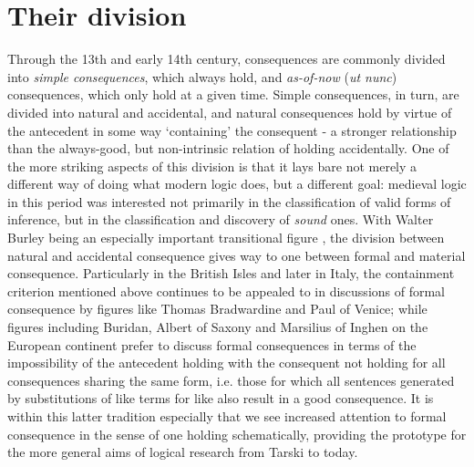\documentclass[]{article}
\begin{document}
\section{Their division}
Through the 13th and early 14th century, 
consequences are commonly divided into \emph{simple consequences}, 
which always hold, 
and \emph{as-of-now} (\emph{ut nunc}) consequences, 
which only hold at a given time. 
Simple consequences, 
in turn, 
are divided into natural and accidental, 
and natural consequences hold by virtue of the antecedent in some way `containing' the consequent 
- a stronger relationship than the always-good, 
but non-intrinsic relation of holding accidentally. 
One of the more striking aspects of this division is that it lays bare not merely a different way of doing what modern logic does, 
but a different goal: 
medieval logic in this period was interested not primarily in the classification of valid forms of inference, 
but in the classification and discovery of \emph{sound} ones. 
With Walter Burley being an especially important transitional figure \autocite{Archambault2018b}, 
the division between natural and accidental consequence gives way to one between formal and material consequence. 
Particularly in the British Isles and later in Italy, 
the containment criterion mentioned above continues to be appealed to in discussions of formal consequence by figures like Thomas Bradwardine and Paul of Venice; 
while figures including Buridan, 
Albert of Saxony 
and Marsilius of Inghen on the European continent prefer to discuss formal consequences in terms of 
the impossibility of the antecedent holding with the consequent not holding 
for all consequences sharing the same form, 
i.e. those for which all sentences generated by substitutions of like terms for like also result in a good consequence.
It is within this latter tradition especially that we see increased attention to formal consequence 
in the sense of one holding schematically, 
providing the prototype for the more general aims of logical research from Tarski to today. 
\printbibliography


\end{document}
